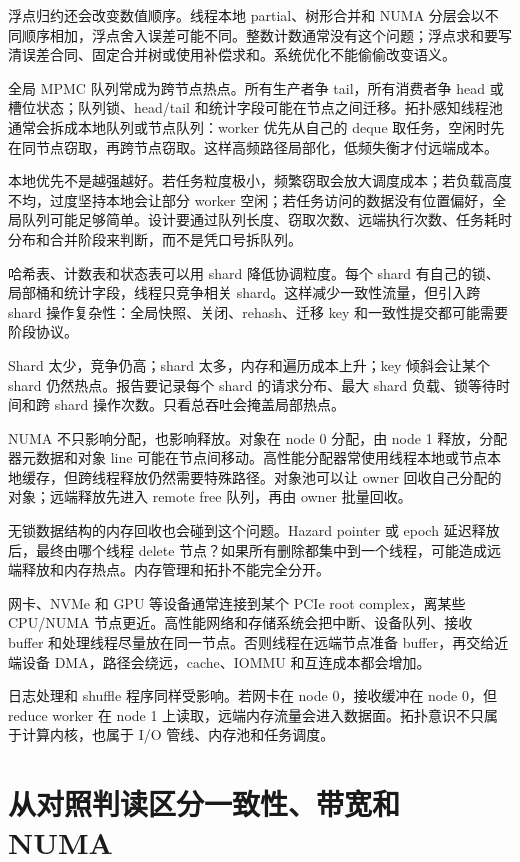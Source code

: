 浮点归约还会改变数值顺序。线程本地 partial、树形合并和 NUMA 分层会以不同顺序相加，浮点舍入误差可能不同。整数计数通常没有这个问题；浮点求和要写清误差合同、固定合并树或使用补偿求和。系统优化不能偷偷改变语义。

全局 MPMC 队列常成为跨节点热点。所有生产者争 tail，所有消费者争 head 或槽位状态；队列锁、head/tail 和统计字段可能在节点之间迁移。拓扑感知线程池通常会拆成本地队列或节点队列：worker 优先从自己的 deque 取任务，空闲时先在同节点窃取，再跨节点窃取。这样高频路径局部化，低频失衡才付远端成本。

本地优先不是越强越好。若任务粒度极小，频繁窃取会放大调度成本；若负载高度不均，过度坚持本地会让部分 worker 空闲；若任务访问的数据没有位置偏好，全局队列可能足够简单。设计要通过队列长度、窃取次数、远端执行次数、任务耗时分布和合并阶段来判断，而不是凭口号拆队列。

哈希表、计数表和状态表可以用 shard 降低协调粒度。每个 shard 有自己的锁、局部桶和统计字段，线程只竞争相关 shard。这样减少一致性流量，但引入跨 shard 操作复杂性：全局快照、关闭、rehash、迁移 key 和一致性提交都可能需要阶段协议。

Shard 太少，竞争仍高；shard 太多，内存和遍历成本上升；key 倾斜会让某个 shard 仍然热点。报告要记录每个 shard 的请求分布、最大 shard 负载、锁等待时间和跨 shard 操作次数。只看总吞吐会掩盖局部热点。

NUMA 不只影响分配，也影响释放。对象在 node 0 分配，由 node 1 释放，分配器元数据和对象 line 可能在节点间移动。高性能分配器常使用线程本地或节点本地缓存，但跨线程释放仍然需要特殊路径。对象池可以让 owner 回收自己分配的对象；远端释放先进入 remote free 队列，再由 owner 批量回收。

无锁数据结构的内存回收也会碰到这个问题。Hazard pointer 或 epoch 延迟释放后，最终由哪个线程 delete 节点？如果所有删除都集中到一个线程，可能造成远端释放和内存热点。内存管理和拓扑不能完全分开。

网卡、NVMe 和 GPU 等设备通常连接到某个 PCIe root complex，离某些 CPU/NUMA 节点更近。高性能网络和存储系统会把中断、设备队列、接收 buffer 和处理线程尽量放在同一节点。否则线程在远端节点准备 buffer，再交给近端设备 DMA，路径会绕远，cache、IOMMU 和互连成本都会增加。

日志处理和 shuffle 程序同样受影响。若网卡在 node 0，接收缓冲在 node 0，但 reduce worker 在 node 1 上读取，远端内存流量会进入数据面。拓扑意识不只属于计算内核，也属于 I/O 管线、内存池和任务调度。

\section{从对照判读区分一致性、带宽和 NUMA}

